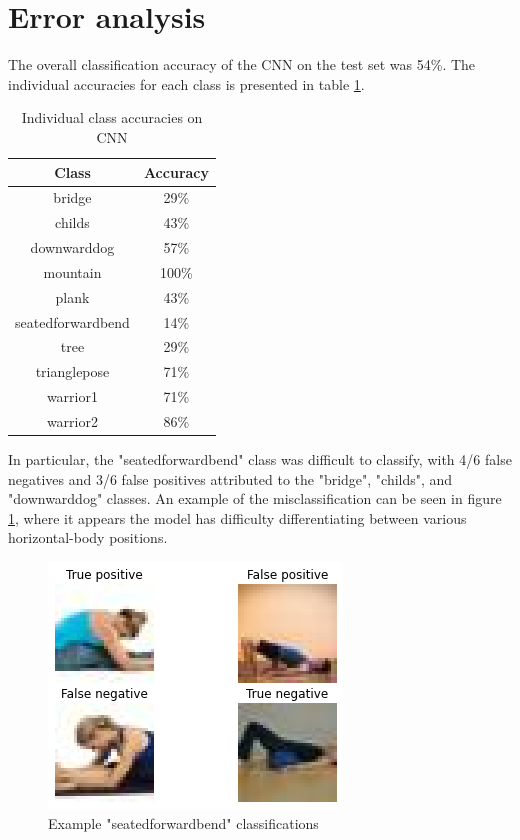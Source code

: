 \documentclass[10pt,a4paper]{article}
\begin{document}
\newpage
\section{Error analysis}
The overall classification accuracy of the CNN on the test set was 54\%.
The individual accuracies for each class is presented in table \ref{Tab:class_acc}.

\begin{table}[H]
	\centering
	\begin{tabular}{|c|c|}
		\hline
		Class & Accuracy \\
		\hline
		bridge & 29\% \\
		\hline
		childs & 43\% \\
		\hline
		downwarddog & 57\% \\
		\hline
		mountain & 100\% \\
		\hline
		plank & 43\% \\
		\hline
		seatedforwardbend & 14\% \\
		\hline
		tree & 29\% \\
		\hline
		trianglepose & 71\% \\
		\hline
		warrior1 & 71\% \\
		\hline
		warrior2 & 86\% \\
		\hline
	\end{tabular}
	\caption{Individual class accuracies on CNN}
	\label{Tab:class_acc}
\end{table}

In particular, the "seatedforwardbend" class was difficult to classify, with 4/6 false negatives and 3/6 false positives attributed to the "bridge", "childs", and "downwarddog" classes. An example of the misclassification can be seen in figure \ref{fig:sfb}, where it appears the model has difficulty differentiating between various horizontal-body positions.

\begin{figure}[H]
	\centering
	\includegraphics[width=0.7\linewidth]{images/sfb}
	\caption{Example "seatedforwardbend" classifications}
	\label{fig:sfb}
\end{figure}
\end{document}
